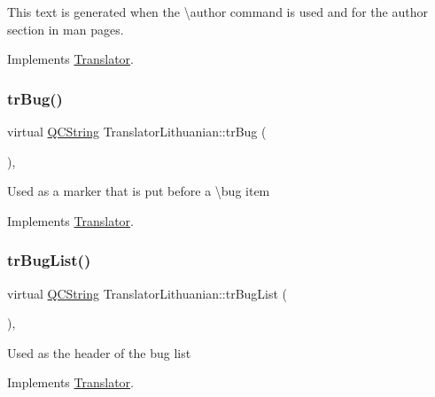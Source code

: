 This text is generated when the \textbackslash{}author command is used and for the author section in man pages. 

Implements \mbox{\hyperlink{class_translator}{Translator}}.

\mbox{\label{class_translator_lithuanian_aad36a1e0cf06ca80ea905bbb2155d719}} 
\subsubsection{\texorpdfstring{trBug()}{trBug()}}
{\footnotesize\ttfamily virtual \mbox{\hyperlink{class_q_c_string}{Q\+C\+String}} Translator\+Lithuanian\+::tr\+Bug (\begin{DoxyParamCaption}{ }\end{DoxyParamCaption})\hspace{0.3cm}{\ttfamily [inline]}, {\ttfamily [virtual]}}

Used as a marker that is put before a \textbackslash{}bug item 

Implements \mbox{\hyperlink{class_translator}{Translator}}.

\mbox{\label{class_translator_lithuanian_a9b718b0580768a5360160af2305f8439}} 
\subsubsection{\texorpdfstring{trBugList()}{trBugList()}}
{\footnotesize\ttfamily virtual \mbox{\hyperlink{class_q_c_string}{Q\+C\+String}} Translator\+Lithuanian\+::tr\+Bug\+List (\begin{DoxyParamCaption}{ }\end{DoxyParamCaption})\hspace{0.3cm}{\ttfamily [inline]}, {\ttfamily [virtual]}}

Used as the header of the bug list 

Implements \mbox{\hyperlink{class_translator}{Translator}}.

\mbox{\label{class_translator_lithuanian_ae519eb25a3b63efecc9581fb472e718f}} 

